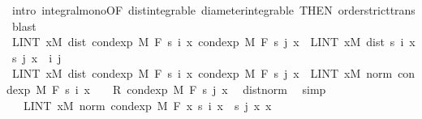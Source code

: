 \begin{isabellebody}
\ {\isacharparenleft}{\kern0pt}intro\ integral{\isacharunderscore}{\kern0pt}mono{\isacharbrackleft}{\kern0pt}OF\ dist{\isacharunderscore}{\kern0pt}integrable\ diameter{\isacharunderscore}{\kern0pt}integrable{\isacharcomma}{\kern0pt}\ THEN\ order{\isachardot}{\kern0pt}strict{\isacharunderscore}{\kern0pt}trans{}{\isacharbrackright}{\kern0pt}{\isacharcomma}{\kern0pt}\ blast{\isacharplus}{\kern0pt}{\isacharparenright}{\kern0pt}\isanewline
\ \ \ \ \isamarkupfalse%
\ \isamarkupfalse%
\ {\isachardoublequoteopen}LINT\ x{\isacharbar}{\kern0pt}M{\isachardot}{\kern0pt}\ dist\ {\isacharparenleft}{\kern0pt}cond{\isacharunderscore}{\kern0pt}exp\ M\ F\ {\isacharparenleft}{\kern0pt}s\ i{\isacharparenright}{\kern0pt}\ x{\isacharparenright}{\kern0pt}\ {\isacharparenleft}{\kern0pt}cond{\isacharunderscore}{\kern0pt}exp\ M\ F\ {\isacharparenleft}{\kern0pt}s\ j{\isacharparenright}{\kern0pt}\ x{\isacharparenright}{\kern0pt}\ {\isasymle}\ LINT\ x{\isacharbar}{\kern0pt}M{\isachardot}{\kern0pt}\ dist\ {\isacharparenleft}{\kern0pt}s\ i\ x{\isacharparenright}{\kern0pt}\ {\isacharparenleft}{\kern0pt}s\ j\ x{\isacharparenright}{\kern0pt}{\isachardoublequoteclose}\ \ i\ j\isanewline
\ \ \ \ \isamarkupfalse%
{\isacharminus}{\kern0pt}\isanewline
\ \ \ \ \ \ \isamarkupfalse%
\ {\isachardoublequoteopen}LINT\ x{\isacharbar}{\kern0pt}M{\isachardot}{\kern0pt}\ dist\ {\isacharparenleft}{\kern0pt}cond{\isacharunderscore}{\kern0pt}exp\ M\ F\ {\isacharparenleft}{\kern0pt}s\ i{\isacharparenright}{\kern0pt}\ x{\isacharparenright}{\kern0pt}\ {\isacharparenleft}{\kern0pt}cond{\isacharunderscore}{\kern0pt}exp\ M\ F\ {\isacharparenleft}{\kern0pt}s\ j{\isacharparenright}{\kern0pt}\ x{\isacharparenright}{\kern0pt}\ {\isacharequal}{\kern0pt}\ LINT\ x{\isacharbar}{\kern0pt}M{\isachardot}{\kern0pt}\ norm\ {\isacharparenleft}{\kern0pt}cond{\isacharunderscore}{\kern0pt}exp\ M\ F\ {\isacharparenleft}{\kern0pt}s\ i{\isacharparenright}{\kern0pt}\ x\ {\isacharplus}{\kern0pt}\ {\isacharminus}{\kern0pt}\ {}\ {\isacharasterisk}{\kern0pt}\isactrlsub R\ cond{\isacharunderscore}{\kern0pt}exp\ M\ F\ {\isacharparenleft}{\kern0pt}s\ j{\isacharparenright}{\kern0pt}\ x{\isacharparenright}{\kern0pt}{\isachardoublequoteclose}\ \isamarkupfalse%
\ dist{\isacharunderscore}{\kern0pt}norm\ \isamarkupfalse%
\ simp\isanewline
\ \ \ \ \ \ \isamarkupfalse%
\ \isamarkupfalse%
\ {\isachardoublequoteopen}{\isachardot}{\kern0pt}{\isachardot}{\kern0pt}{\isachardot}{\kern0pt}\ {\isacharequal}{\kern0pt}\ LINT\ x{\isacharbar}{\kern0pt}M{\isachardot}{\kern0pt}\ norm\ {\isacharparenleft}{\kern0pt}cond{\isacharunderscore}{\kern0pt}exp\ M\ F\ {\isacharparenleft}{\kern0pt}{\isasymlambda}x{\isachardot}{\kern0pt}\ s\ i\ x\ {\isacharminus}{\kern0pt}\ s\ j\ x{\isacharparenright}{\kern0pt}\ x{\isacharparenright}{\kern0pt}{\isachardoublequoteclose}\ \isamarkupfalse%

\end{isabellebody}
